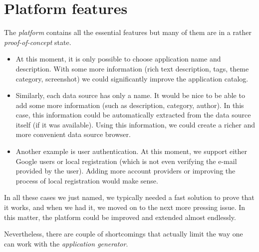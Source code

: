 \section{Platform features}

The \emph{platform} contains all the essential features but many of them are in a rather \emph{proof-of-concept} state.

\begin{itemize}
\item At this moment, it is only possible to choose application name and description. With some more information (rich text description, tags, theme category, screenshot) we could significantly improve the application catalog.
\item Similarly, each data source has only a name. It would be nice to be able to add some more information (such as description, category, author). In this case, this information could be automatically extracted from the data source itself (if it was available). Using this information, we could create a richer and more convenient data source browser. 
\item Another example is user authentication. At this moment, we support either Google users or local registration (which is not even verifying the e-mail provided by the user). Adding more account providers or improving the process of local registration would make sense.
\end{itemize}

In all these cases we just named, we typically needed a fast solution to prove that it works, and when we had it, we moved on to the next more pressing issue. In this matter, the platform could be improved and extended almost endlessly.

Nevertheless, there are couple of shortcomings that actually limit the way one can work with the \emph{application generator}. 

